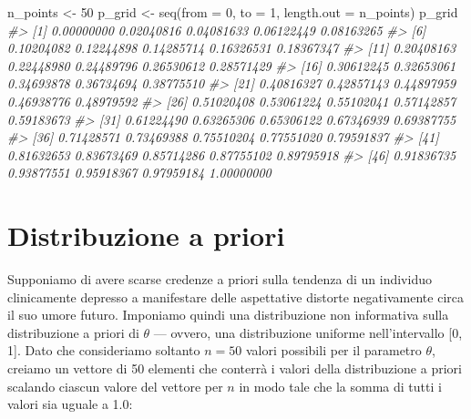 \documentclass[
]{memoir}
\newenvironment{Shaded}{\begin{snugshade}}{\end{snugshade}}
\newcommand{\AttributeTok}[1]{\textcolor[rgb]{0.77,0.63,0.00}{#1}}
\newcommand{\CommentTok}[1]{\textcolor[rgb]{0.56,0.35,0.01}{\textit{#1}}}
\newcommand{\DecValTok}[1]{\textcolor[rgb]{0.00,0.00,0.81}{#1}}
\newcommand{\FunctionTok}[1]{\textcolor[rgb]{0.00,0.00,0.00}{#1}}
\newcommand{\NormalTok}[1]{#1}
\newcommand{\OtherTok}[1]{\textcolor[rgb]{0.56,0.35,0.01}{#1}}
\begin{document}
\begin{Shaded}
\begin{Highlighting}[]
\NormalTok{n\_points }\OtherTok{\textless{}{-}} \DecValTok{50}
\NormalTok{p\_grid }\OtherTok{\textless{}{-}} \FunctionTok{seq}\NormalTok{(}\AttributeTok{from =} \DecValTok{0}\NormalTok{, }\AttributeTok{to =} \DecValTok{1}\NormalTok{, }\AttributeTok{length.out =}\NormalTok{ n\_points)}
\NormalTok{p\_grid}
\CommentTok{\#\textgreater{}  [1] 0.00000000 0.02040816 0.04081633 0.06122449 0.08163265}
\CommentTok{\#\textgreater{}  [6] 0.10204082 0.12244898 0.14285714 0.16326531 0.18367347}
\CommentTok{\#\textgreater{} [11] 0.20408163 0.22448980 0.24489796 0.26530612 0.28571429}
\CommentTok{\#\textgreater{} [16] 0.30612245 0.32653061 0.34693878 0.36734694 0.38775510}
\CommentTok{\#\textgreater{} [21] 0.40816327 0.42857143 0.44897959 0.46938776 0.48979592}
\CommentTok{\#\textgreater{} [26] 0.51020408 0.53061224 0.55102041 0.57142857 0.59183673}
\CommentTok{\#\textgreater{} [31] 0.61224490 0.63265306 0.65306122 0.67346939 0.69387755}
\CommentTok{\#\textgreater{} [36] 0.71428571 0.73469388 0.75510204 0.77551020 0.79591837}
\CommentTok{\#\textgreater{} [41] 0.81632653 0.83673469 0.85714286 0.87755102 0.89795918}
\CommentTok{\#\textgreater{} [46] 0.91836735 0.93877551 0.95918367 0.97959184 1.00000000}
\end{Highlighting}
\end{Shaded}

\hypertarget{distribuzione-a-priori}{%
\section{Distribuzione a priori}\label{distribuzione-a-priori}}

Supponiamo di avere scarse credenze a priori sulla tendenza di un individuo clinicamente depresso a manifestare delle aspettative distorte negativamente circa il suo umore futuro. Imponiamo quindi una distribuzione non informativa sulla distribuzione a priori di \(\theta\) --- ovvero, una distribuzione uniforme nell'intervallo {[}0, 1{]}. Dato che consideriamo soltanto \(n = 50\) valori possibili per il parametro \(\theta\), creiamo un vettore di 50 elementi che conterrà i valori della distribuzione a priori scalando ciascun valore del vettore per \(n\) in modo tale che la somma di tutti i valori sia uguale a 1.0:
\end{document}
